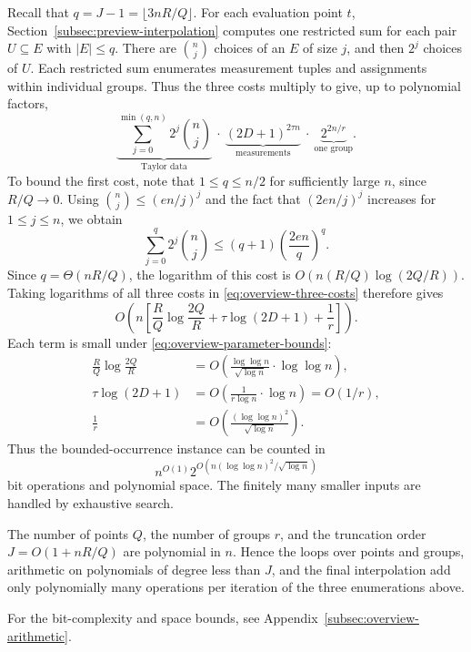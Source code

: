 Recall that $q=J-1=\lfloor3nR/Q\rfloor$. For each evaluation
point $t$, Section~\ref{subsec:preview-interpolation} computes one
restricted sum for each pair $U\subseteq E$ with $|E|\le q$.
There are $\binom nj$ choices of an $E$ of size $j$, and then
$2^j$ choices of $U$. Each restricted sum enumerates measurement
tuples and assignments within individual groups. Thus the three
costs multiply to give, up to polynomial factors,
\begin{equation}\label{eq:overview-three-costs}
 \underbrace{\sum_{j=0}^{\min(q,n)}2^j\binom nj}_{\text{Taylor data}}
 \ \cdot\
 \underbrace{(2D+1)^{2\tau n}}_{\text{measurements}}
 \ \cdot\
 \underbrace{2^{2n/r}}_{\text{one group}}.
\end{equation}
To bound the first cost, note that $1\le q\le n/2$ for
sufficiently large $n$, since $R/Q\to0$. Using
$\binom nj\le(en/j)^j$ and the fact that $(2en/j)^j$ increases
for $1\le j\le n$, we obtain
\[
 \sum_{j=0}^q2^j\binom nj
 \le(q+1)\left(\frac{2en}{q}\right)^q.
\]
Since $q=\Theta(nR/Q)$, the logarithm of this cost is
$O(n(R/Q)\log(2Q/R))$. Taking logarithms of all three costs in
\eqref{eq:overview-three-costs} therefore gives
\[
 O\!\left(n\left[
       \frac RQ\log\frac{2Q}{R}
       +\tau\log(2D+1)+\frac1r\right]\right).
\]
Each term is small under \eqref{eq:overview-parameter-bounds}:
\[
 \begin{aligned}
 \frac RQ\log\frac{2Q}{R}
   &=O\!\left(\frac{\log\log n}{\sqrt{\log n}}
                      \cdot\log\log n\right),\\
 \tau\log(2D+1)&=O\!\left(\frac1{r\log n}\cdot\log n\right)
                  =O(1/r),\\
 \frac1r&=O\!\left(\frac{(\log\log n)^2}{\sqrt{\log n}}\right).
 \end{aligned}
\]
Thus the bounded-occurrence instance can be counted in
\begin{equation}\label{eq:overview-bounded-time}
 n^{O(1)}2^{O(n(\log\log n)^2/\sqrt{\log n})}
\end{equation}
bit operations and polynomial space. The finitely many smaller
inputs are handled by exhaustive search.

The number of points $Q$, the number of groups $r$, and the
truncation order $J=O(1+nR/Q)$ are polynomial in $n$. Hence the
loops over points and groups, arithmetic on polynomials of degree
less than $J$, and the final interpolation add only polynomially
many operations per iteration of the three enumerations above.

For the bit-complexity and space bounds, see
Appendix~\ref{subsec:overview-arithmetic}.

